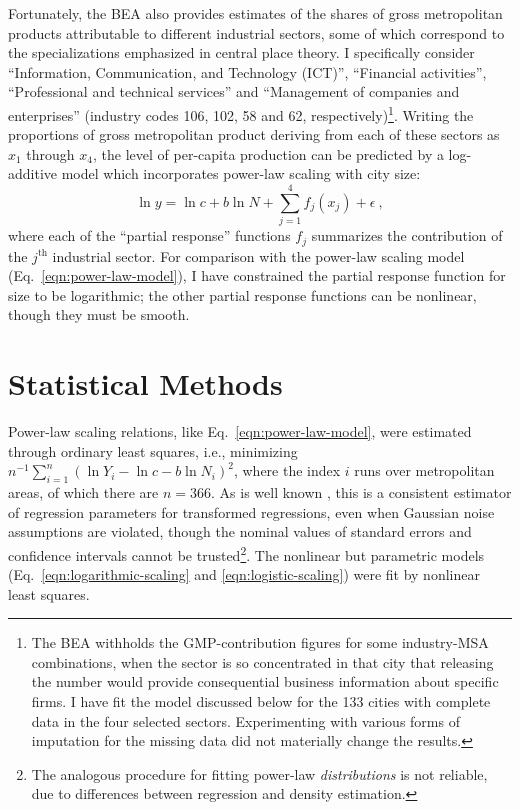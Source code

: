 \documentclass{pnastwo}
\begin{document}
\begin{article}
Fortunately, the BEA also provides estimates of the shares of gross
metropolitan products attributable to different industrial sectors, some of
which correspond to the specializations emphasized in central place theory.  I
specifically consider ``Information, Communication, and Technology (ICT)'',
``Financial activities'', ``Professional and technical services'' and
``Management of companies and enterprises'' (industry codes 106, 102, 58 and
62, respectively)\footnote{The BEA withholds the GMP-contribution figures for
  some industry-MSA combinations, when the sector is so concentrated in that
  city that releasing the number would provide consequential business
  information about specific firms.  I have fit the model discussed below for
  the 133 cities with complete data in the four selected sectors.
  Experimenting with various forms of imputation for the missing data did not
  materially change the results.}.  Writing the proportions of gross
metropolitan product deriving from each of these sectors as $x_1$ through
$x_4$, the level of per-capita production can be predicted by a log-additive
model \cite{Buja-Hastie-Tibshirani-additive-models} which incorporates
power-law scaling with city size:
\begin{equation}
\ln{y} = \ln{c} + b\ln{N} + \sum_{j=1}^{4}{f_j(x_j)} + \epsilon ~,
\label{eqn:additive-model}
\end{equation}
where each of the ``partial response'' functions $f_j$ summarizes the
contribution of the $j^{\mathrm{th}}$ industrial sector.  For comparison with
the power-law scaling model (Eq.\ \ref{eqn:power-law-model}), I have
constrained the partial response function for size to be logarithmic; the other
partial response functions can be nonlinear, though they must be smooth.

\section{Statistical Methods}

Power-law scaling relations, like Eq.\ \ref{eqn:power-law-model}, were
estimated through ordinary least squares, i.e., minimizing
$n^{-1}\sum_{i=1}^{n}{(\ln{Y_i} - \ln{c} - b\ln{N_i})^2}$, where the index $i$
runs over metropolitan areas, of which there are $n=366$.  As is well known
\cite{Wasserman-all-of-stats}, this is a consistent estimator of regression
parameters for transformed regressions, even when Gaussian noise assumptions
are violated, though the nominal values of standard errors and confidence
intervals cannot be trusted\footnote{The analogous procedure for fitting
  power-law {\em distributions} is not reliable, due to differences between
  regression and density estimation.}.  The nonlinear but parametric models
(Eq.\ \ref{eqn:logarithmic-scaling} and \ref{eqn:logistic-scaling}) were fit by
nonlinear least squares.


\end{article}
\end{document}
